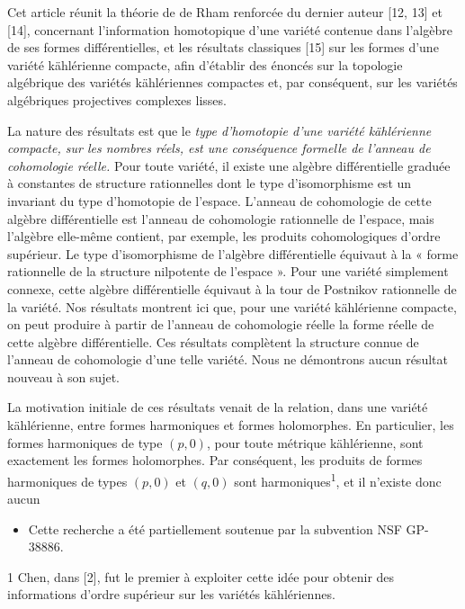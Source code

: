 \documentclass[
  french,
  a3paper,
  a3paper]{extarticle}
\providecommand{\tightlist}{%
  \setlength{\itemsep}{0pt}\setlength{\parskip}{0pt}}
\begin{document}
Cet article réunit la théorie de de Rham renforcée du dernier auteur
{[}12, 13{]} et {[}14{]}, concernant l'information homotopique d'une
variété contenue dans l'algèbre de ses formes différentielles, et les
résultats classiques {[}15{]} sur les formes d'une variété kählérienne
compacte, afin d'établir des énoncés sur la topologie algébrique des
variétés kählériennes compactes et, par conséquent, sur les variétés
algébriques projectives complexes lisses.

La nature des résultats est que le \emph{type d'homotopie d'une variété
kählérienne compacte, sur les nombres réels, est une conséquence
formelle de l'anneau de cohomologie réelle.} Pour toute variété, il
existe une algèbre différentielle graduée à constantes de structure
rationnelles dont le type d'isomorphisme est un invariant du type
d'homotopie de l'espace. L'anneau de cohomologie de cette algèbre
différentielle est l'anneau de cohomologie rationnelle de l'espace, mais
l'algèbre elle-même contient, par exemple, les produits cohomologiques
d'ordre supérieur. Le type d'isomorphisme de l'algèbre différentielle
équivaut à la « forme rationnelle de la structure nilpotente de l'espace
». Pour une variété simplement connexe, cette algèbre différentielle
équivaut à la tour de Postnikov rationnelle de la variété. Nos résultats
montrent ici que, pour une variété kählérienne compacte, on peut
produire à partir de l'anneau de cohomologie réelle la forme réelle de
cette algèbre différentielle. Ces résultats complètent la structure
connue de l'anneau de cohomologie d'une telle variété. Nous ne
démontrons aucun résultat nouveau à son sujet.

La motivation initiale de ces résultats venait de la relation, dans une
variété kählérienne, entre formes harmoniques et formes holomorphes. En
particulier, les formes harmoniques de type \((p,0)\), pour toute
métrique kählérienne, sont exactement les formes holomorphes. Par
conséquent, les produits de formes harmoniques de types \((p,0)\) et
\((q,0)\) sont harmoniques\textsuperscript{1}, et il n'existe donc aucun

\begin{itemize}
\tightlist
\item
  Cette recherche a été partiellement soutenue par la subvention NSF
  GP-38886.
\end{itemize}

1 Chen, dans {[}2{]}, fut le premier à exploiter cette idée pour obtenir
des informations d'ordre supérieur sur les variétés kählériennes.
\end{document}
